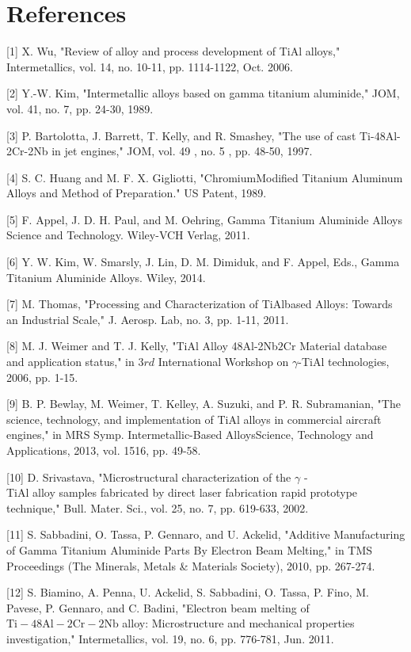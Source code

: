 \documentclass[10pt]{article}
\begin{document}
\section*{References}
[1] X. Wu, "Review of alloy and process development of TiAl alloys," Intermetallics, vol. 14, no. 10-11, pp. 1114-1122, Oct. 2006.

[2] Y.-W. Kim, "Intermetallic alloys based on gamma titanium aluminide," JOM, vol. 41, no. 7, pp. 24-30, 1989.

[3] P. Bartolotta, J. Barrett, T. Kelly, and R. Smashey, "The use of cast Ti-48Al-2Cr-2Nb in jet engines," JOM, vol. 49 , no. 5 , pp. 48-50, 1997.

[4] S. C. Huang and M. F. X. Gigliotti, "ChromiumModified Titanium Aluminum Alloys and Method of Preparation." US Patent, 1989.

[5] F. Appel, J. D. H. Paul, and M. Oehring, Gamma Titanium Aluminide Alloys Science and Technology. Wiley-VCH Verlag, 2011.

[6] Y. W. Kim, W. Smarsly, J. Lin, D. M. Dimiduk, and F. Appel, Eds., Gamma Titanium Aluminide Alloys. Wiley, 2014.

[7] M. Thomas, "Processing and Characterization of TiAlbased Alloys: Towards an Industrial Scale," J. Aerosp. Lab, no. 3, pp. 1-11, 2011.

[8] M. J. Weimer and T. J. Kelly, "TiAl Alloy 48Al-2Nb$2 \mathrm{Cr}$ Material database and application status," in $3 r d$ International Workshop on $\gamma$-TiAl technologies, 2006, pp. 1-15.

[9] B. P. Bewlay, M. Weimer, T. Kelley, A. Suzuki, and P. R. Subramanian, "The science, technology, and implementation of TiAl alloys in commercial aircraft engines," in MRS Symp. Intermetallic-Based AlloysScience, Technology and Applications, 2013, vol. 1516, pp. 49-58.

[10] D. Srivastava, "Microstructural characterization of the $\gamma$ -\\
TiAl alloy samples fabricated by direct laser fabrication rapid prototype technique," Bull. Mater. Sci., vol. 25, no. 7, pp. 619-633, 2002.

[11] S. Sabbadini, O. Tassa, P. Gennaro, and U. Ackelid, "Additive Manufacturing of Gamma Titanium Aluminide Parts By Electron Beam Melting," in TMS Proceedings (The Minerals, Metals \& Materials Society), 2010, pp. 267-274.

[12] S. Biamino, A. Penna, U. Ackelid, S. Sabbadini, O. Tassa, P. Fino, M. Pavese, P. Gennaro, and C. Badini, "Electron beam melting of $\mathrm{Ti}-48 \mathrm{Al}-2 \mathrm{Cr}-2 \mathrm{Nb}$ alloy: Microstructure and mechanical properties investigation," Intermetallics, vol. 19, no. 6, pp. 776-781, Jun. 2011.
\end{document}
